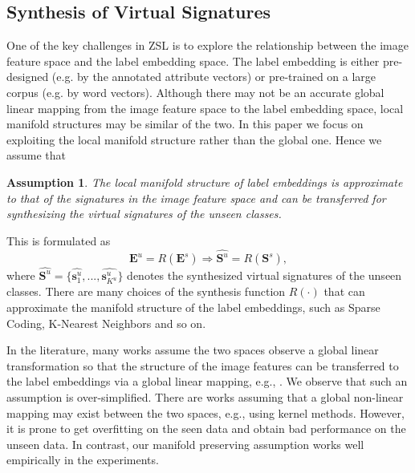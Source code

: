\documentclass{article}
\newtheorem{as}{Assumption}
\begin{document}
\subsection{Synthesis of Virtual Signatures}
One of the key challenges in ZSL is to explore the relationship between the image feature space and the label embedding space. The label embedding is either pre-designed (e.g. by the annotated attribute vectors) or pre-trained on a large corpus (e.g. by word vectors). Although there may not be an accurate global linear mapping from the image feature space to the label embedding space, local manifold structures may be similar of the two.
In this paper we focus on exploiting the local manifold structure rather than the global one. Hence we assume that
\begin{as}
\label{assum2}
The local manifold structure of label embeddings is approximate to that of the signatures in the image feature space and can be transferred for synthesizing the virtual signatures of the unseen classes.
\end{as}
This is formulated as
\begin{equation}
\bm{E}^u =R\left ( \bm{E}^s \right ) \Rightarrow \widehat{\bm{S}^u}=R\left ( \bm{S}^s \right),
\end{equation}
where $\widehat{\bm{S}^u}=\{\widehat{\bm{s}^u_1},...,\widehat{\bm{s}^u_{K^u}}\}$ denotes the synthesized virtual signatures of the unseen classes. There are many choices of the synthesis function $R(\cdot)$ that can approximate the manifold structure of the label embeddings, such as Sparse Coding, K-Nearest Neighbors and so on.

In the literature, many works assume the two spaces observe a global linear transformation so that the structure of the image features can be transferred to the label embeddings via a global linear mapping, e.g., \cite{al2016recovering}\cite{qiao2016less}. We observe that such an assumption is over-simplified. There are works assuming that a global non-linear mapping may exist between the two spaces\cite{romera2015embarrassingly}, e.g., using kernel methods. However, it is prone to get overfitting on the seen data and obtain bad performance on the unseen data. In contrast, our manifold preserving assumption works well empirically in the experiments.
\end{document}
